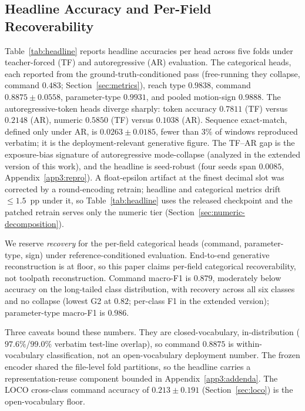 \documentclass[conference]{IEEEtran}
\begin{document}
\subsection{Headline Accuracy and Per-Field Recoverability}
\label{sec:results-headline}

Table~\ref{tab:headline} reports headline accuracies per head across five folds under teacher-forced (TF) and autoregressive (AR) evaluation. The categorical heads, each reported from the ground-truth-conditioned pass (free-running they collapse, command $0.483$; Section~\ref{sec:metrics}), reach type $0.9838$, command $0.8875 \pm 0.0558$, parameter-type $0.9931$, and pooled motion-sign $0.9888$. The autoregressive-token heads diverge sharply: token accuracy $0.7811$ (TF) versus $0.2148$ (AR), numeric $0.5850$ (TF) versus $0.1038$ (AR). Sequence exact-match, defined only under AR, is $0.0263 \pm 0.0185$, fewer than $3\%$ of windows reproduced verbatim; it is the deployment-relevant generative figure. The TF--AR gap is the exposure-bias signature of autoregressive mode-collapse (analyzed in the extended version of this work), and the headline is seed-robust (four seeds span $0.0085$, Appendix~\ref{app3:repro}). A float-epsilon artifact at the finest decimal slot was corrected by a round-encoding retrain; headline and categorical metrics drift $\le\!1.5$~pp under it, so Table~\ref{tab:headline} uses the released checkpoint and the patched retrain serves only the numeric tier (Section~\ref{sec:numeric-decomposition}).

We reserve \emph{recovery} for the per-field categorical heads (command, parameter-type, sign) under reference-conditioned evaluation. End-to-end generative reconstruction is at floor, so this paper claims per-field categorical recoverability, not toolpath reconstruction. Command macro-F1 is $0.879$, moderately below accuracy on the long-tailed class distribution, with recovery across all six classes and no collapse (lowest G2 at $0.82$; per-class F1 in the extended version); parameter-type macro-F1 is $0.986$.

Three caveats bound these numbers. They are closed-vocabulary, in-distribution ($97.6\%$/$99.0\%$ verbatim test-line overlap), so command $0.8875$ is within-vocabulary classification, not an open-vocabulary deployment number. The frozen encoder shared the file-level fold partitions, so the headline carries a representation-reuse component bounded in Appendix~\ref{app3:addenda}. The LOCO cross-class command accuracy of $0.213 \pm 0.191$ (Section~\ref{sec:loco}) is the open-vocabulary floor.
\end{document}
